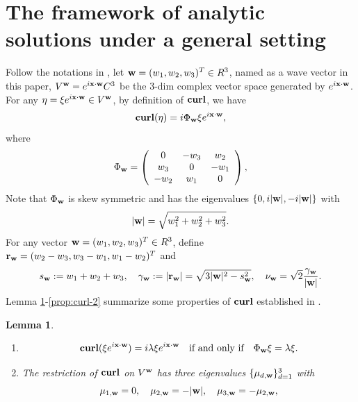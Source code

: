 \documentclass[10pt,reqno]{amsart}
\renewcommand{\(}{\left(}
\renewcommand{\)}{\right)}
\newcommand{\bw}{{\bf w}}
\newcommand{\CU}{{\bf curl}}
\newcommand{\bx}{\mathbf{x}}
\newcommand{\br}{{\mathbf r}}
\newtheorem{lem}[theo]{Lemma}
\numberwithin{equation}{section}
\begin{document}
\section{The framework of analytic solutions under a general setting}\label{sec:j=general}
Follow the notations in \cite{zou_maxwell}, let $\bw =(w_1,w_2, w_3)^T\in R^3$, named as a wave vector in this paper, $V^{\bw}=e^{i\bx \cdot \bw} C^3$ be the $3$-dim complex vector space generated by $e^{i\bx \cdot \bw}$. For any $\eta =\xi e^{i\bx \cdot \bw} \in V^{\bw}$, by definition of $\CU$, we have
\[
\CU (\eta) = i  \Phi_{\bw}\xi e^{i\bx \cdot \bw},
\]
where
\begin{equation}\label{eq:phi}
	\Phi_{\bw}=\left(
	\begin{array}{ccc}
		0 & -w_3 &w_2\\
		w_3 & 0 & -w_1 \\
		-w_2 & w_1 & 0
	\end{array}
	\right),
\end{equation}
Note that $\Phi_{\bw}$ is skew symmetric and has the eigenvalues  $\{0, i|\bw|, -i|\bw|\}$ 
with
\[
|\bw| = \sqrt{w_1^2 + w_2^2 +w_3^2}.
\]
For any vector ${\bw}=(w_1,w_2,w_3)^T\in R^3$, define ${\br}_{\bw} = (w_2-w_3, w_3-w_1, w_1-w_2)^T$ and
\[
s_{\bw} := w_1+w_2+w_3, \quad  \gamma_{\bw} := |{\br}_{\bw}|  = \sqrt{3|\bw|^2 - s_{\bw}^2}, \quad  \nu_{\bw} = \sqrt 2\frac{\gamma_{\bw} }{|\bw|}.
\]
Lemma \ref{prop:curl-1}-\ref{prop:curl-2} summarize some properties of $\CU$ established in \cite{zou_maxwell}.
\begin{lem}\label{prop:curl-1}
	\begin{enumerate}
		\item 
	\begin{equation}\label{eq:Phi_w}
		\CU (\xi e^{i\bx \cdot \bw})= i\lambda \xi e^{i\bx \cdot \bw}  \quad \mbox{if and only if} \quad	\Phi_{\bw}\xi = \lambda \xi.
	\end{equation}
	\item 
 The restriction of $\CU$ on $V^{\bw}$ has three eigenvalues  $\{\mu_{d,\bw}\}_{d=1}^3 $ with
\begin{equation}\label{eq:eigenvalue}
\mu_{1,\bw} = 0, \quad \mu_{2,\bw} = -|\bw|, \quad \mu_{3,\bw} = -\mu_{2,\bw},
\end{equation}
	\end{enumerate}
\end{lem}
\end{document}
